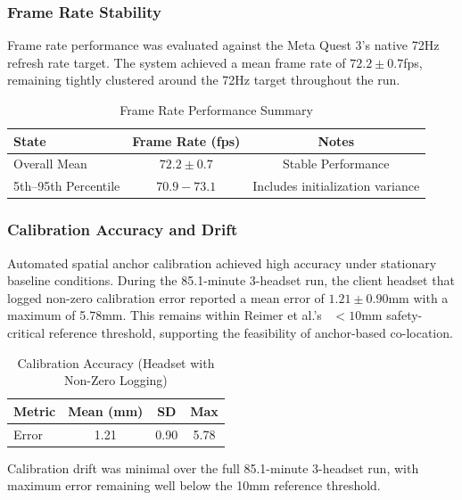 \subsubsection{Frame Rate Stability}

Frame rate performance was evaluated against the Meta Quest 3's native 72Hz refresh rate target. The system achieved a mean frame rate of $72.2 \pm 0.7$fps, remaining tightly clustered around the 72Hz target throughout the run.

\begin{table}[h]
\centering
\caption{Frame Rate Performance Summary}
\begin{tabular}{|l|c|c|}
\hline
\textbf{State} & \textbf{Frame Rate (fps)} & \textbf{Notes} \\
\hline
Overall Mean & $72.2 \pm 0.7$ & Stable Performance \\
5th--95th Percentile & $70.9 - 73.1$ & Includes initialization variance \\
\hline
\end{tabular}
\end{table}

\subsubsection{Calibration Accuracy and Drift}

Automated spatial anchor calibration achieved high accuracy under stationary baseline conditions. During the 85.1-minute 3-headset run, the client headset that logged non-zero calibration error reported a mean error of $1.21 \pm 0.90$mm with a maximum of 5.78mm. This remains within Reimer et al.'s~\cite{ReimerDennis2021CfSV} $<10$mm safety-critical reference threshold, supporting the feasibility of anchor-based co-location.

\begin{table}[h]
\centering
\caption{Calibration Accuracy (Headset with Non-Zero Logging)}
\begin{tabular}{|l|c|c|c|}
\hline
\textbf{Metric} & \textbf{Mean (mm)} & \textbf{SD} & \textbf{Max} \\
\hline
Error & 1.21 & 0.90 & 5.78 \\
\hline
\end{tabular}
\end{table}

Calibration drift was minimal over the full 85.1-minute 3-headset run, with maximum error remaining well below the 10mm reference threshold.

